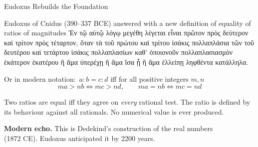 \documentclass[aspectratio=169]{beamer}
\begin{document}
\begin{frame}{Eudoxus Rebuilds the Foundation}
        \begin{block} {Eudoxus of Cnidus (390--337 BCE) answered with a new
                        definition of equality of ratios of magnitudes}
                Ἐν τῷ αὐτῷ λόγῳ μεγέθη λέγεται εἶναι πρῶτον πρὸς δεύτερον
                καὶ τρίτον πρὸς τέταρτον, ὅταν τὰ τοῦ πρώτου καὶ τρίτου ἰσάκις
                πολλαπλάσια τῶν τοῦ δευτέρου καὶ τετάρτου ἰσάκις πολλαπλασίων
                καθ’ ὁποιονοῦν πολλαπλασιασμὸν ἑκάτερον ἑκατέρου ἢ ἅμα ὑπερέχῃ
                ἢ ἅμα ἴσα ᾖ ἢ ἅμα ἐλλείπῃ ληφθέντα κατάλληλα.

                Or in modern notation:\
                $a:b = c:d$ iff for all positive integers $m, n$
                \vspace{-1em}
                \[
                        ma > nb \iff mc > nd,
                        \qquad
                        ma = nb \iff mc = nd
                \]
        \end{block}
        
        \vspace{0.1em}
        Two ratios are equal iff they agree on \emph{every} rational
        test. The ratio is defined by its behaviour against all
        rationals. No numerical value is ever produced.

        \vspace{0.2em}
        \textcolor{TealThr}{\textbf{Modern echo.}} This is Dedekind's
        construction of the real numbers\\ (1872 CE). Eudoxus anticipated
        it by 2200 years.
\end{frame}
\end{document}
